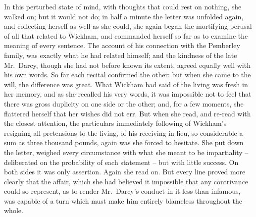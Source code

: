 In this perturbed state of mind, with thoughts that
could rest on nothing, she walked on; but it would not
do; in half a minute the letter was unfolded again, and
collecting herself as well as she could, she again began
the mortifying perusal of all that related to Wickham,
and commanded herself so far as to examine the meaning
of every sentence. The account of his connection with
the Pemberley family, was exactly what he had related
himself; and the kindness of the late Mr.\ Darcy, though
she had not before known its extent, agreed equally well
with his own words. So far each recital confirmed the
other: but when she came to the will, the difference was
great. What Wickham had said of the living was fresh
in her memory, and as she recalled his very words, it was
impossible not to feel that there was gross duplicity on
one side or the other; and, for a few moments, she flattered
herself that her wishes did not err. But when she read,
and re-read with the closest attention, the particulars
immediately following of Wickham’s resigning all pretensions
to the living, of his receiving in lieu, so considerable
a sum as three thousand pounds, again was she forced
to hesitate. She put down the letter, weighed every
circumstance with what she meant to be impartiality -- deliberated
on the probability of each statement -- but
with little success. On both sides it was only assertion.
Again she read on. But every line proved more clearly
that the affair, which she had believed it impossible that
any contrivance could so represent, as to render Mr.\ Darcy’s
conduct in it less than infamous, was capable of a turn
which must make him entirely blameless throughout the
whole.

